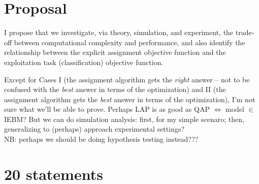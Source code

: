 \section{Proposal}

I propose that we investigate,
via theory, simulation, and experiment,
the trade-off between computational complexity and performance,
and also identify the relationship between
the explicit assignment objective function
and the exploitation task (classification) objective function.

Except for Cases
I
(the assignment algorithm gets the {\em right} answer --
not to be confused with the {\em best} answer in terms of the optimization)
and
II
(the assignment algorithm gets the {\em best} answer in terms of the optimization),
I'm not sure what we'll be able to prove.
Perhaps
\thma
LAP is as good as QAP $\iff$ model $\in$ IEBM?
\thmb
But we can do simulation analysis:
first, for my simple scenaro;
then, generalizing to (perhaps) approach experimental settings?
\\

NB: perhaps we should be doing hypothesis testing instead???


\section{20 statements}

